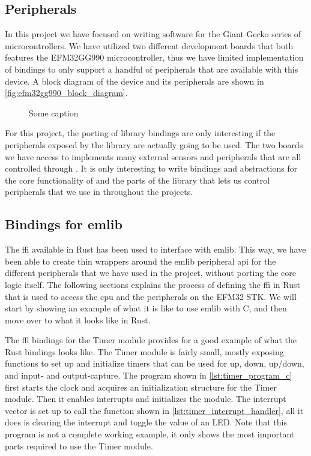 
\subsection{Peripherals}
\label{sub:peripherals}

In this project we have focused on writing software for the Giant Gecko series of microcontrollers.
We have utilized two different development boards that both features the EFM32GG990 microcontroller,
thus we have limited implementation of bindings to only support a handful of peripherals that are
available with this device. A block diagram of the device and its peripherals are shown in
\autoref{fig:efm32gg990_block_diagram}.

\begin{figure}[tb]
\centering
{}
\caption{Some caption}
\label{fig:efm32gg990_block_diagram}
\end{figure}

For this project, the porting of library bindings are only interesting if the peripherals exposed by
the library are actually going to be used. The two boards we have access to implements many external
sensors and peripherals that are all controlled through \emlib. It is only interesting to write
bindings and abstractions for the core functionality of \emlib and the parts of the library that
lets us control peripherals that we use in throughout the projects.


\subsection{Bindings for emlib} %
\label{sub:interfacing_with_emlib}

The \gls{ffi} available in Rust has been used to interface with emlib. This way, we have been able
to create thin wrappers around the emlib peripheral \gls{api} for the different peripherals that we
have used in the project, without porting the core logic itself. The following sections explains the
process of defining the \gls{ffi} in Rust that is used to access the \gls{cpu} and the peripherals
on the EFM32 STK. We will start by showing an example of what it is like to use emlib with C, and
then move over to what it looks like in Rust.

The \gls{ffi} bindings for the Timer module \cite{an0014_timer} provides for a good example of what
the Rust bindings looks like. The Timer module is fairly small, mostly exposing functions to set up
and initialize timers that can be used for up, down, up/down, and input- and output-capture. The
program shown in \autoref{lst:timer_program_c} first starts the clock and acquires an initialization
structure for the Timer module. Then it enables interrupts and initializes the module. The interrupt
vector is set up to call the function shown in \autoref{lst:timer_interrupt_handler}, all it does is
clearing the interrupt and toggle the value of an LED. Note that this program is not a complete
working example, it only shows the most important parts required to use the Timer module.

